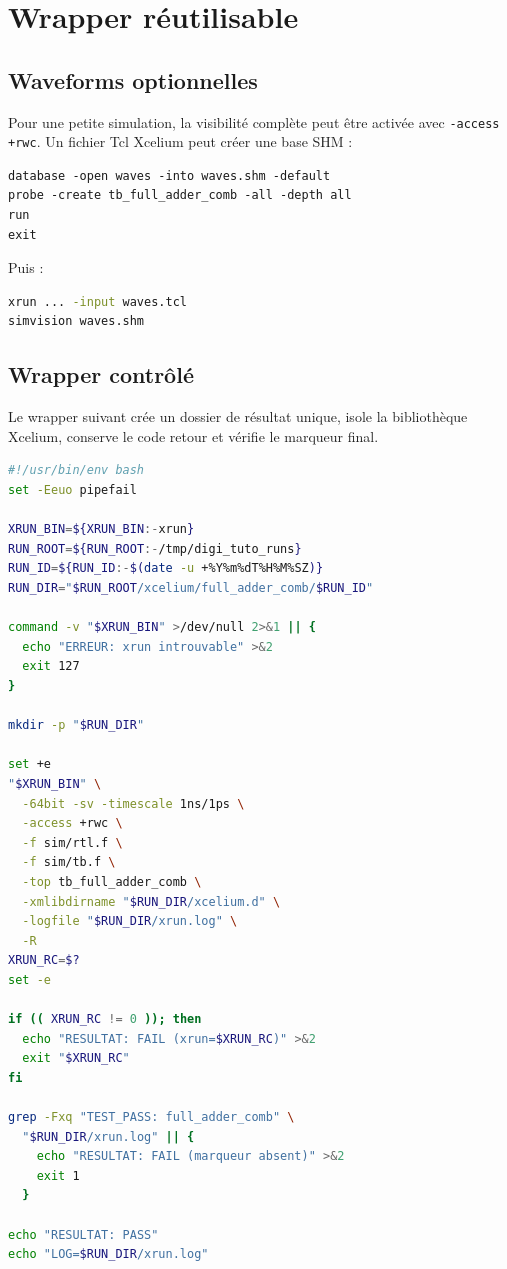 \documentclass[11pt,a4paper,openany]{report}
\begin{document}
\chapter{Wrapper réutilisable}

\section{Waveforms optionnelles}

Pour une petite simulation, la visibilité complète peut être activée avec
\texttt{-access +rwc}. Un fichier Tcl Xcelium peut créer une base SHM :

\begin{lstlisting}[style=guidecode]
database -open waves -into waves.shm -default
probe -create tb_full_adder_comb -all -depth all
run
exit
\end{lstlisting}

Puis :

\begin{lstlisting}[style=guidecode,language=bash]
xrun ... -input waves.tcl
simvision waves.shm
\end{lstlisting}

\section{Wrapper contrôlé}

Le wrapper suivant crée un dossier de résultat unique, isole la bibliothèque
Xcelium, conserve le code retour et vérifie le marqueur final.

\begin{lstlisting}[style=guidecode,language=bash,
caption={run\_xcelium.sh}]
#!/usr/bin/env bash
set -Eeuo pipefail

XRUN_BIN=${XRUN_BIN:-xrun}
RUN_ROOT=${RUN_ROOT:-/tmp/digi_tuto_runs}
RUN_ID=${RUN_ID:-$(date -u +%Y%m%dT%H%M%SZ)}
RUN_DIR="$RUN_ROOT/xcelium/full_adder_comb/$RUN_ID"

command -v "$XRUN_BIN" >/dev/null 2>&1 || {
  echo "ERREUR: xrun introuvable" >&2
  exit 127
}

mkdir -p "$RUN_DIR"

set +e
"$XRUN_BIN" \
  -64bit -sv -timescale 1ns/1ps \
  -access +rwc \
  -f sim/rtl.f \
  -f sim/tb.f \
  -top tb_full_adder_comb \
  -xmlibdirname "$RUN_DIR/xcelium.d" \
  -logfile "$RUN_DIR/xrun.log" \
  -R
XRUN_RC=$?
set -e

if (( XRUN_RC != 0 )); then
  echo "RESULTAT: FAIL (xrun=$XRUN_RC)" >&2
  exit "$XRUN_RC"
fi

grep -Fxq "TEST_PASS: full_adder_comb" \
  "$RUN_DIR/xrun.log" || {
    echo "RESULTAT: FAIL (marqueur absent)" >&2
    exit 1
  }

echo "RESULTAT: PASS"
echo "LOG=$RUN_DIR/xrun.log"
\end{lstlisting}
\end{document}
